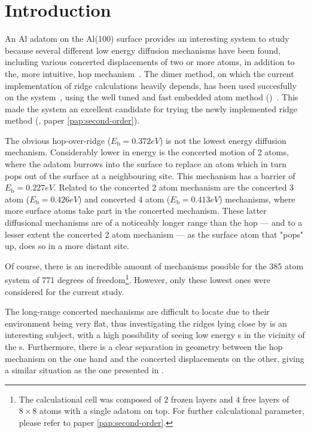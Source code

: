 \section{Introduction}
\label{sec:al-introduction}
An Al adatom on the Al(100) surface provides an interesting system to study because several different low energy diffusion mechanisms have been found, including various concerted displacements of two or more atoms, in addition to the, more intuitive, hop mechanism~\cite{concerted-motion-1990, dimer-original-1999, ts-opt-2001}.
The dimer method, on which the current implementation of ridge calculations heavily depends, has been used succesfully on the system~\cite{dimer-original1999}, using the well tuned and fast embedded atom method ()~\cite{eam-1983, eam-1986}.
This made the system an excellent candidate for trying the newly implemented ridge method (, paper \ref{pap:second-order}).

The obvious hop-over-ridge ($E_\text{b} = 0.372\unit{eV}$) is not the lowest energy diffusion mechanism.
Considerably lower in energy is the concerted motion of 2 atoms, where the adatom burrows into the surface to replace an atom which in turn pops out of the surface at a neighbouring site.
This mechanism has a barrier of $E_\text{b} = 0.227\unit{eV}$.
Related to the concerted 2 atom mechanism are the concerted 3 atom ($E_\text{b} = 0.426\unit{eV}$) and concerted 4 atom ($E_\text{b} = 0.413\unit{eV}$) mechanisms, where more surface atoms take part in the concerted mechanism.
These latter diffusional mechanisms are of a noticeably longer range than the hop --- and to a lesser extent the concerted 2 atom mechanism --- as the surface atom that "pops" up, does so in a more distant site.

Of course, there is an incredible amount of mechanisms possible for the 385 atom system of 771 degrees of freedom\footnote{The calculational cell was composed of $2$ frozen layers and $4$ free layers of $8\times 8$ atoms with a single adatom on top. For further calculational parameter, please refer to paper \ref{pap:second-order}.}.
However, only these lowest ones were considered for the current study.

The long-range concerted mechanisms are difficult to locate due to their environment being very flat, thus investigating the ridges lying close by is an interesting subject, with a high possibility of seeing low energy s in the vicinity of the s.
Furthermore, there is a clear separation in geometry between the hop mechanism on the one hand and the concerted displacements on the other, giving a similar situation as the one presented in .
